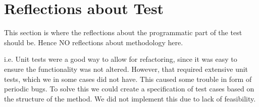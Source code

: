 \section{Reflections about Test}
This section is where the reflections about the programmatic part of the test should be. Hence NO reflections about methodology here.

i.e. Unit tests were a good way to allow for refactoring, since it was easy to ensure the functionality was not altered. However, that required extensive unit tests, which we in some cases did not have. This caused some trouble in form of periodic bugs. To solve this we could create a specification of test cases based on the structure of the method. We did not implement this due to lack of feasibility.
